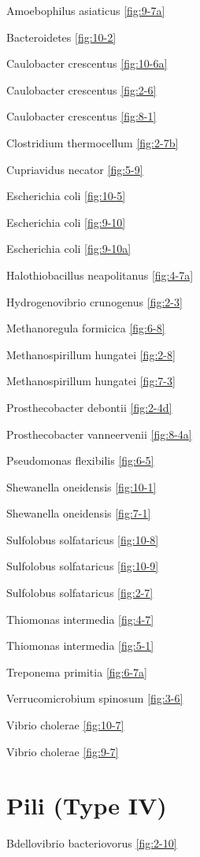 \documentclass[]{tufte-book}
\begin{document}
Amoebophilus asiaticus \ref{fig:9-7a}

Bacteroidetes \ref{fig:10-2}

Caulobacter crescentus \ref{fig:10-6a}

Caulobacter crescentus \ref{fig:2-6}

Caulobacter crescentus \ref{fig:8-1}

Clostridium thermocellum \ref{fig:2-7b}

Cupriavidus necator \ref{fig:5-9}

Escherichia coli \ref{fig:10-5}

Escherichia coli \ref{fig:9-10}

Escherichia coli \ref{fig:9-10a}

Halothiobacillus neapolitanus \ref{fig:4-7a}

Hydrogenovibrio crunogenus \ref{fig:2-3}

Methanoregula formicica \ref{fig:6-8}

Methanospirillum hungatei \ref{fig:2-8}

Methanospirillum hungatei \ref{fig:7-3}

Prosthecobacter debontii \ref{fig:2-4d}

Prosthecobacter vanneervenii \ref{fig:8-4a}

Pseudomonas flexibilis \ref{fig:6-5}

Shewanella oneidensis \ref{fig:10-1}

Shewanella oneidensis \ref{fig:7-1}

Sulfolobus solfataricus \ref{fig:10-8}

Sulfolobus solfataricus \ref{fig:10-9}

Sulfolobus solfataricus \ref{fig:2-7}

Thiomonas intermedia \ref{fig:4-7}

Thiomonas intermedia \ref{fig:5-1}

Treponema primitia \ref{fig:6-7a}

Verrucomicrobium spinosum \ref{fig:3-6}

Vibrio cholerae \ref{fig:10-7}

Vibrio cholerae \ref{fig:9-7}

\hypertarget{pili-type-iv}{%
\section*{Pili (Type IV)}\label{pili-type-iv}}

Bdellovibrio bacteriovorus \ref{fig:2-10}
\end{document}
